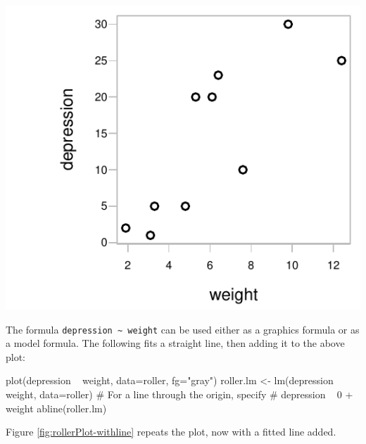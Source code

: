 \begin{marginfigure}
\begin{Schunk}


\centerline{\includegraphics[width=\textwidth]{figs/8-plt-roller-1} }

\end{Schunk}
  \caption{Plot of  versus , using data
from the data frame  in the {\em DAAG}
package.}\label{fig:rollerPlot}
\end{marginfigure}

The formula \verb!depression ~ weight! can be used either as a
graphics formula or as a model formula. The following
fits a straight line, then adding it to the above plot:
\begin{Schunk}
\begin{Sinput}
plot(depression ~ weight, data=roller, fg="gray")
roller.lm <- lm(depression ~ weight, data=roller)
# For a line through the origin, specify
# depression ~ 0 + weight
abline(roller.lm)
\end{Sinput}
\end{Schunk}
Figure \ref{fig:rollerPlot-withline} repeats the plot, now with a
fitted line added.

